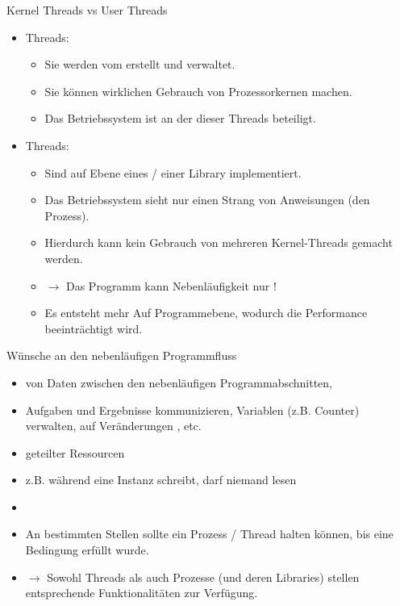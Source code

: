 \documentclass[12pt, aspectratio=169, usepdftitle=false]{beamer}
\begin{document}
\begin{frame}[fragile]{Kernel Threads vs User Threads}
	\begin{itemize}
		\pause
		\item {} Threads:
		\pause
		\begin{itemize}
			\item Sie werden vom  erstellt und verwaltet.
			\pause
			\item Sie können wirklichen Gebrauch von  Prozessorkernen machen.
			\pause
			\item Das Betriebssystem ist an der  dieser Threads beteiligt.
		\end{itemize}
		\pause
		
		\item {} Threads:  
		\begin{itemize}
			\pause
			\item Sind auf Ebene eines  / einer Library implementiert.
			\pause
			\item Das Betriebssystem sieht nur einen Strang von Anweisungen (den Prozess). 
			\item[] Hierdurch kann kein Gebrauch von mehreren Kernel-Threads gemacht werden.
			\pause
			\item[] $\rightarrow$ Das Programm kann Nebenläufigkeit nur !
			\pause
			\item Es entsteht mehr  Auf Programmebene, wodurch die Performance beeinträchtigt wird.
		\end{itemize}
	\end{itemize}
\end{frame}

\begin{frame}[fragile]{Wünsche an den nebenläufigen Programmfluss}
	\begin{itemize}
		\item {} von Daten zwischen den nebenläufigen Programmabschnitten,
		\item[] Aufgaben und Ergebnisse kommunizieren,  Variablen (z.B. Counter) verwalten, auf Veränderungen , etc.
		
		\pause
		
		\item {} geteilter Ressourcen
		\item[] z.B. während eine Instanz schreibt, darf niemand lesen
		
		\pause
		
		\item {}
		\item[] An bestimmten Stellen sollte ein Prozess / Thread halten können, bis eine Bedingung erfüllt wurde.
		
		\item $\rightarrow$ Sowohl Threads als auch Prozesse (und deren Libraries) stellen entsprechende Funktionalitäten zur Verfügung. 
	\end{itemize}
\end{frame}
\end{document}
